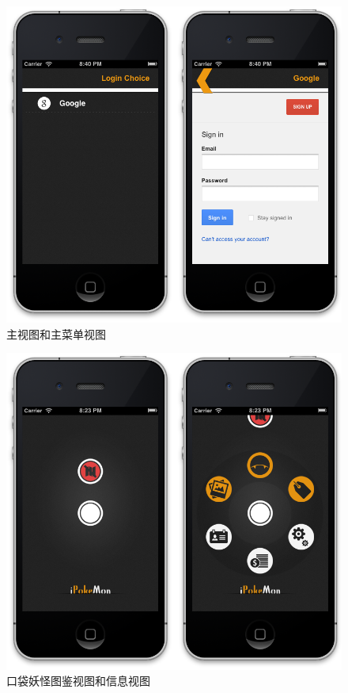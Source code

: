 \documentclass{article}
\begin{document}
\begin{CJK}{UTF8}{gbsn}
  \begin{figure}[htbp]
		\centering
		\includegraphics[bb=0 0 790 744, scale=0.45]{figure/fig_n21.png}
		\caption{主视图和主菜单视图}
		\label{fig:n21}
	\end{figure}

  \begin{figure}[htbp]
		\centering
		\includegraphics[bb=0 0 790 744, scale=0.45]{figure/fig_n22.png}
		\caption{口袋妖怪图鉴视图和信息视图}
		\label{fig:n22}
	\end{figure}


\end{CJK}
\end{document}
